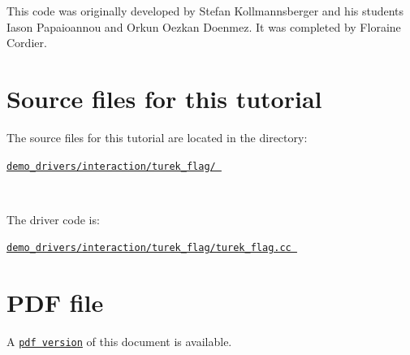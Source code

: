 \begin{DoxyItemize}
\item This code was originally developed by Stefan Kollmannsberger and his students Iason Papaioannou and Orkun Oezkan Doenmez. It was completed by Floraine Cordier.
\end{DoxyItemize}



 

\hypertarget{index_sources}{}\section{Source files for this tutorial}\label{index_sources}

\begin{DoxyItemize}
\item The source files for this tutorial are located in the directory\+:~\newline
~\newline
\begin{center} \href{../../../../demo_drivers/interaction/turek_flag/}{\tt demo\+\_\+drivers/interaction/turek\+\_\+flag/ } \end{center} ~\newline

\item The driver code is\+: ~\newline
~\newline
\begin{center} \href{../../../../demo_drivers/interaction/turek_flag/turek_flag.cc}{\tt demo\+\_\+drivers/interaction/turek\+\_\+flag/turek\+\_\+flag.\+cc } \end{center} 
\end{DoxyItemize}



 

 \hypertarget{index_pdf}{}\section{P\+D\+F file}\label{index_pdf}
A \href{../latex/refman.pdf}{\tt pdf version} of this document is available. 
